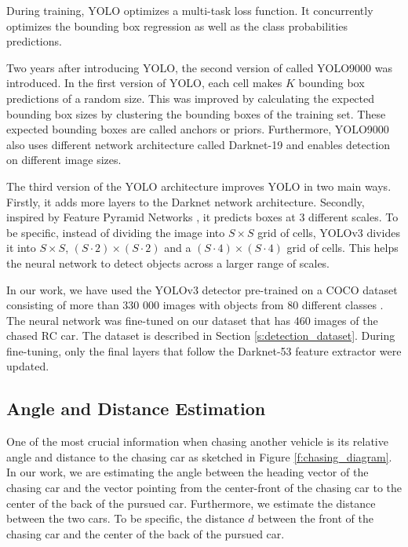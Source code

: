 \documentclass{ctuthesis/ctuthesis}
\begin{document}
During training, YOLO optimizes a multi-task loss function. It concurrently optimizes the bounding box regression as well as the class probabilities predictions.


Two years after introducing YOLO, the second version of called YOLO9000 \cite{YOLO9000} was introduced. In the first version of YOLO, each cell makes $K$ bounding box predictions of a random size. This was improved by calculating the expected bounding box sizes by clustering the bounding boxes of the training set. These expected bounding boxes are called anchors or priors. Furthermore, YOLO9000 also uses different network architecture called Darknet-19 and enables detection on different image sizes. \par


The third version of the YOLO architecture \cite{YOLOv3} improves YOLO in two main ways. Firstly, it adds more layers to the Darknet network architecture. Secondly, inspired by Feature Pyramid Networks \cite{FPN}, it predicts boxes at 3 different scales. To be specific, instead of dividing the image into $S\times S$ grid of cells, YOLOv3 divides it into $S\times S$, $(S\cdot2)\times (S\cdot2)$ and a $(S\cdot4)\times (S\cdot4)$ grid of cells. This helps the neural network to detect objects across a larger range of scales.


In our work, we have used the YOLOv3 detector pre-trained on a COCO dataset consisting of more than 330 000 images with objects from 80 different classes \cite{COCO_dataset}. The neural network was fine-tuned on our dataset that has 460 images of the chased RC car. The dataset is described in Section \ref{s:detection_dataset}. During fine-tuning, only the final layers that follow the Darknet-53 feature extractor were updated.




\subsection{Angle and Distance Estimation}
One of the most crucial information when chasing another vehicle is its relative angle and distance to the chasing car as sketched in Figure \ref{f:chasing_diagram}. In our work, we are estimating the angle between the heading vector of the chasing car and the vector pointing from the center-front of the chasing car to the center of the back of the pursued car. Furthermore, we estimate the distance between the two cars. To be specific, the distance $d$ between the front of the chasing car and the center of the back of the pursued car. \par
\end{document}
